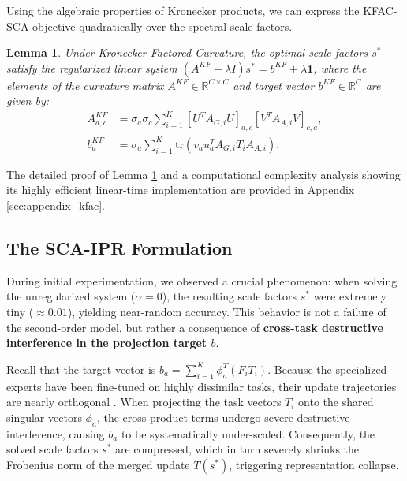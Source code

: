 \documentclass{article}
\theoremstyle{plain}
\newtheorem{lemma}[theorem]{Lemma}
\theoremstyle{definition}
\theoremstyle{remark}
\begin{document}
Using the algebraic properties of Kronecker products, we can express the KFAC-SCA objective quadratically over the spectral scale factors.
\begin{lemma}
Under Kronecker-Factored Curvature, the optimal scale factors $s^*$ satisfy the regularized linear system $(A^{KF} + \lambda I) s^* = b^{KF} + \lambda \mathbf{1}$, where the elements of the curvature matrix $A^{KF} \in \mathbb{R}^{C \times C}$ and target vector $b^{KF} \in \mathbb{R}^C$ are given by:
\begin{align}
    A^{KF}_{a,c} &= \sigma_a \sigma_c \sum_{i=1}^K \left[ U^T A_{G,i} U \right]_{a,c} \left[ V^T A_{A,i} V \right]_{c,a}, \\
    b^{KF}_a &= \sigma_a \sum_{i=1}^K \text{tr}\left( v_a u_a^T A_{G,i} T_i A_{A,i} \right).
\end{align}
\label{lem:kfac_sca}
\end{lemma}
The detailed proof of Lemma \ref{lem:kfac_sca} and a computational complexity analysis showing its highly efficient linear-time implementation are provided in Appendix \ref{sec:appendix_kfac}.

\subsection{The SCA-IPR Formulation}
\label{subsec:scaipr}

During initial experimentation, we observed a crucial phenomenon: when solving the unregularized system ($\alpha = 0$), the resulting scale factors $s^*$ were extremely tiny ($\approx 0.01$), yielding near-random accuracy. 
This behavior is not a failure of the second-order model, but rather a consequence of \textbf{cross-task destructive interference in the projection target $b$}.

Recall that the target vector is $b_a = \sum_{i=1}^K \phi_a^T \left( F_i T_i \right)$. 
Because the specialized experts have been fine-tuned on highly dissimilar tasks, their update trajectories are nearly orthogonal \cite{sub9_ipr, sub7_hns}. 
When projecting the task vectors $T_i$ onto the shared singular vectors $\phi_a$, the cross-product terms undergo severe destructive interference, causing $b_a$ to be systematically under-scaled. 
Consequently, the solved scale factors $s^*$ are compressed, which in turn severely shrinks the Frobenius norm of the merged update $T(s^*)$, triggering representation collapse.
\end{document}
